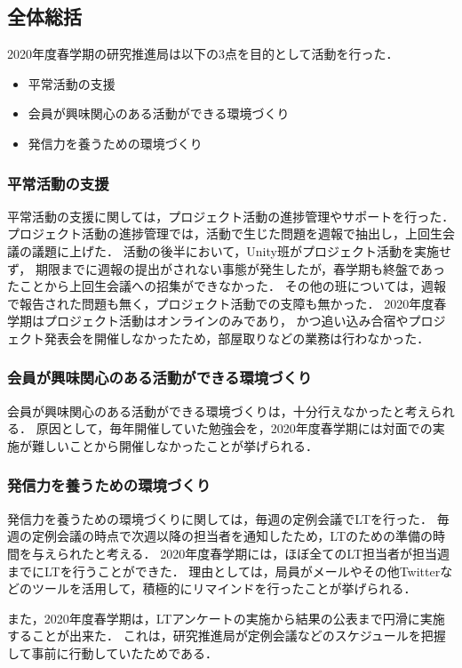 \subsection*{全体総括}



2020年度春学期の研究推進局は以下の3点を目的として活動を行った．
\begin{itemize}
\item 平常活動の支援
\item 会員が興味関心のある活動ができる環境づくり
\item 発信力を養うための環境づくり
\end{itemize}

\subsubsection*{平常活動の支援}
平常活動の支援に関しては，プロジェクト活動の進捗管理やサポートを行った．
プロジェクト活動の進捗管理では，活動で生じた問題を週報で抽出し，上回生会議の議題に上げた．
活動の後半において，Unity班がプロジェクト活動を実施せず，
期限までに週報の提出がされない事態が発生したが，春学期も終盤であったことから上回生会議への招集ができなかった．
その他の班については，週報で報告された問題も無く，プロジェクト活動での支障も無かった．
2020年度春学期はプロジェクト活動はオンラインのみであり，
かつ追い込み合宿やプロジェクト発表会を開催しなかったため，部屋取りなどの業務は行わなかった．

\subsubsection*{会員が興味関心のある活動ができる環境づくり}
会員が興味関心のある活動ができる環境づくりは，十分行えなかったと考えられる．
原因として，毎年開催していた勉強会を，2020年度春学期には対面での実施が難しいことから開催しなかったことが挙げられる．

\subsubsection*{発信力を養うための環境づくり}
発信力を養うための環境づくりに関しては，毎週の定例会議でLTを行った．
毎週の定例会議の時点で次週以降の担当者を通知したため，LTのための準備の時間を与えられたと考える．
2020年度春学期には，ほぼ全てのLT担当者が担当週までにLTを行うことができた．
理由としては，局員がメールやその他Twitterなどのツールを活用して，積極的にリマインドを行ったことが挙げられる．

また，2020年度春学期は，LTアンケートの実施から結果の公表まで円滑に実施することが出来た．
これは，研究推進局が定例会議などのスケジュールを把握して事前に行動していたためである．
